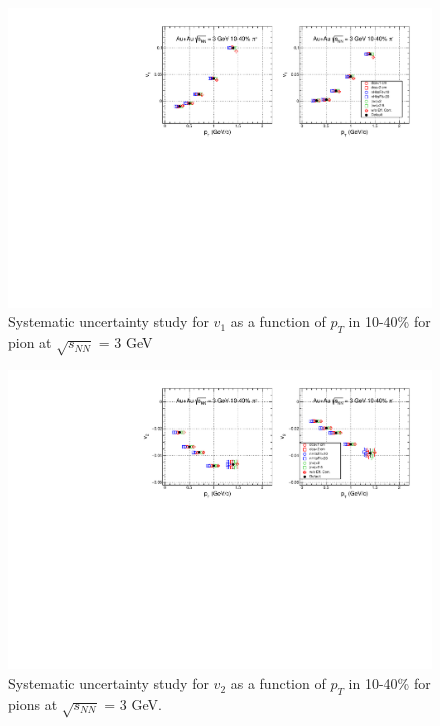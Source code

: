\begin{figure}[h]
\includegraphics[scale=0.8]{FXT3gev/chapter3/fig/sys/pion/v1pt_pion_sys.pdf}
\caption{Systematic uncertainty study for $v_{1}$ as a function of $p_{T}$ in 10-40\% for pion at $\sqrt{s_{NN}}$ = 3 GeV}
\label{fig:pion_v1pt_sys}
\end{figure}

\begin{figure}[h]
\includegraphics[scale=0.8]{FXT3gev/chapter3/fig/sys/pion/v2pt_pion_sys.pdf}
\caption{Systematic uncertainty study for $v_{2}$ as a function of $p_{T}$ in 10-40\% for pions at $\sqrt{s_{NN}}$ = 3 GeV.}
\label{fig:pion_v2pt_sys}
\end{figure}


